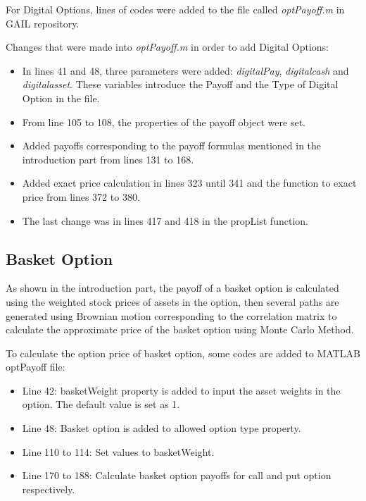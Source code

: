 \documentclass[]{elsarticle}
\theoremstyle{definition}
\theoremstyle{remark}
\begin{document}
For Digital Options, lines of codes were added to the file called \textit{optPayoff.m} in GAIL repository. 

Changes that were made into \textit{optPayoff.m} in order to add Digital Options:
\begin{itemize}
\item In lines 41 and 48, three parameters were added: \textit{digitalPay}, \textit{digitalcash} and \textit{digitalasset}. These variables introduce the Payoff and the Type of Digital Option in the file.
\item From line 105 to 108, the properties of the payoff object were set.
\item Added payoffs corresponding to the payoff formulas mentioned in the introduction part from lines 131 to 168.
\item Added exact price calculation in lines 323 until 341 and the function to exact price from lines 372 to 380.
\item The last change was in lines 417 and 418 in the propList function.
\end{itemize}

\subsection{Basket Option}

As shown in the introduction part, the payoff of a basket option is calculated using the weighted stock prices of assets in the option, then several paths are generated using Brownian motion corresponding to the correlation matrix to calculate the approximate price of the basket option using Monte Carlo Method.

To calculate the option price of basket option, some codes are added to MATLAB optPayoff file:
\begin{itemize}
\item Line 42: basketWeight property is added to input the asset weights in the option. The default value is set as 1.
\item Line 48: Basket option is added to allowed option type property.
\item Line 110 to 114: Set values to basketWeight.
\item Line 170 to 188: Calculate basket option payoffs for call and put option respectively.
\end{itemize}
\end{document}
